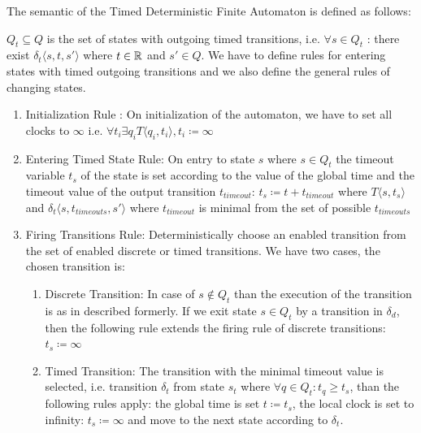 			The semantic of the Timed Deterministic Finite Automaton is defined as follows:
			
			$Q_t \subseteq Q$ is the set of states with outgoing timed transitions, 
			i.e. $\forall s \in Q_t$ : there exist $ \delta_t\langle s, t, s' \rangle$ where $t \in \mathbb{R}$ and $s' \in Q$.
			We have to define rules for entering states with timed outgoing transitions and we also define the general rules of changing states. 
			
			\begin{enumerate}
				\item Initialization Rule : On initialization of the automaton, we have to set all clocks to $\infty$ 
				i.e. $\forall t_i \exists q_i T \langle q_i, t_i \rangle, t_i \coloneqq \infty $
				
				\item Entering Timed State Rule: On entry to state $s$ where $s \in Q_t$ the timeout variable $t_s$ of the state is set according to the value of the global time and the timeout value of the output transition $t_{timeout}$:
					$t_s\coloneqq t+t_{timeout}$ %
					where $T\langle s,t_s \rangle$ and $\delta_t\langle s,t_{timeouts},s' \rangle$ where $t_{timeout}$ is minimal from the set of possible $t_{timeouts}$ 
				
				\item Firing Transitions Rule: Deterministically choose an enabled transition from the set of enabled discrete or timed transitions. We have two cases, the chosen transition is:
					\begin{enumerate}
						\item Discrete Transition: In case of $s \notin Q_t$ than the execution of the transition is as in described formerly. If we exit state $s \in Q_t$ by a transition in $\delta_d$, 
						then the following rule extends the firing rule of discrete transitions:
							$t_s \coloneqq \infty$
						\item Timed Transition: The transition with the minimal timeout value is selected, i.e. transition $\delta_t$ from state $s_t$ where $\forall q \in Q_t: t_q \geq t_s$, than the following rules apply:
						 the global time is set $t \coloneqq t_s$, the local clock is set to infinity: $t_s \coloneqq \infty$ and move to the next state according to $\delta_t$.
					\end{enumerate}			
			\end{enumerate}
		
